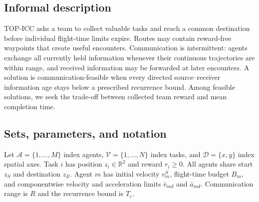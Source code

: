 \subsection{Informal description}
TOP-ICC asks a team to collect valuable tasks and reach a common destination before individual flight-time limits expire. Routes may contain reward-free waypoints that create useful encounters. Communication is intermittent: agents exchange all currently held information whenever their continuous trajectories are within range, and received information may be forwarded at later encounters. A solution is communication-feasible when every directed source--receiver information age stays below a prescribed recurrence bound. Among feasible solutions, we seek the trade-off between collected team reward and mean completion time.

\subsection{Sets, parameters, and notation}
Let $\mathcal A=\{1,\ldots,M\}$ index agents, $\mathcal V=\{1,\ldots,N\}$ index tasks, and $\mathcal D=\{x,y\}$ index spatial axes. Task $i$ has position $z_i\in\mathbb R^2$ and reward $r_i\ge0$. All agents share start $z_S$ and destination $z_E$. Agent $m$ has initial velocity $v_m^S$, flight-time budget $B_m$, and componentwise velocity and acceleration limits $\bar v_{md}$ and $\bar a_{md}$. Communication range is $R$ and the recurrence bound is $T_c$.

